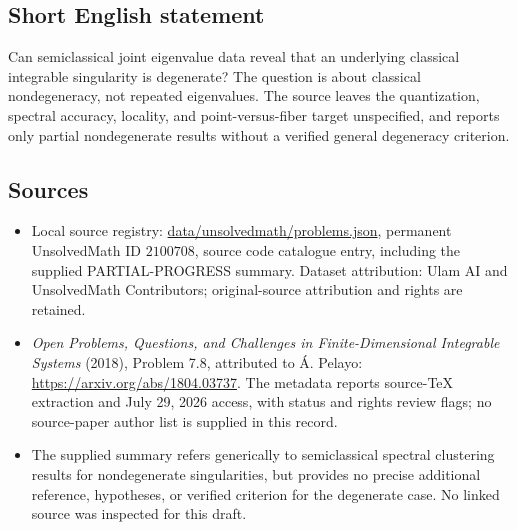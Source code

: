 \documentclass[11pt]{article}
\begin{document}
\subsection{Short English statement}
Can semiclassical joint eigenvalue data reveal that an underlying classical integrable singularity is degenerate? The question is about classical nondegeneracy, not repeated eigenvalues. The source leaves the quantization, spectral accuracy, locality, and point-versus-fiber target unspecified, and reports only partial nondegenerate results without a verified general degeneracy criterion.
\subsection{Sources}
\begin{itemize}
\item Local source registry: \url{data/unsolvedmath/problems.json}, permanent UnsolvedMath ID $2100708$, source code catalogue entry, including the supplied PARTIAL-PROGRESS summary. Dataset attribution: Ulam AI and UnsolvedMath Contributors; original-source attribution and rights are retained.
\item \emph{Open Problems, Questions, and Challenges in Finite-Dimensional Integrable Systems} (2018), Problem 7.8, attributed to \'{A}. Pelayo: \url{https://arxiv.org/abs/1804.03737}. The metadata reports source-TeX extraction and July 29, 2026 access, with status and rights review flags; no source-paper author list is supplied in this record.
\item The supplied summary refers generically to semiclassical spectral clustering results for nondegenerate singularities, but provides no precise additional reference, hypotheses, or verified criterion for the degenerate case. No linked source was inspected for this draft.
\end{itemize}
\end{document}
